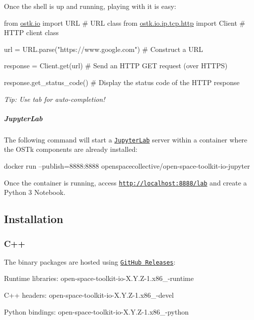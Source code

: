 Once the shell is up and running, playing with it is easy\+:


\begin{DoxyCode}
\textcolor{keyword}{from} \hyperlink{namespaceostk_1_1io}{ostk.io} \textcolor{keyword}{import} URL \textcolor{comment}{# URL class}
\textcolor{keyword}{from} \hyperlink{namespaceostk_1_1io_1_1ip_1_1tcp_1_1http}{ostk.io.ip.tcp.http} \textcolor{keyword}{import} Client \textcolor{comment}{# HTTP client class}

url = URL.parse(\textcolor{stringliteral}{"https://www.google.com"}) \textcolor{comment}{# Construct a URL}

response = Client.get(url) \textcolor{comment}{# Send an HTTP GET request (over HTTPS)}

response.get\_status\_code() \textcolor{comment}{# Display the status code of the HTTP response}
\end{DoxyCode}


{\itshape Tip\+: Use tab for auto-\/completion!}

\subparagraph*{Jupyter\+Lab}

The following command will start a \href{https://jupyterlab.readthedocs.io/en/stable/}{\tt Jupyter\+Lab} server within a container where the O\+S\+Tk components are already installed\+:


\begin{DoxyCode}
docker run --publish=8888:8888 openspacecollective/open-space-toolkit-io-jupyter
\end{DoxyCode}


Once the container is running, access \href{http://localhost:8888/lab}{\tt http\+://localhost\+:8888/lab} and create a Python 3 Notebook.

\subsection*{Installation}

\subsubsection*{C++}

The binary packages are hosted using \href{https://github.com/open-space-collective/open-space-toolkit-io/releases}{\tt Git\+Hub Releases}\+:


\begin{DoxyItemize}
\item Runtime libraries\+: {\ttfamily open-\/space-\/toolkit-\/io-\/\+X.\+Y.\+Z-\/1.\+x86\+\_-\/runtime}
\item C++ headers\+: {\ttfamily open-\/space-\/toolkit-\/io-\/\+X.\+Y.\+Z-\/1.\+x86\+\_-\/devel}
\item Python bindings\+: {\ttfamily open-\/space-\/toolkit-\/io-\/\+X.\+Y.\+Z-\/1.\+x86\+\_-\/python}
\end{DoxyItemize}

